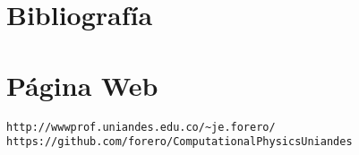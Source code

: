 \documentclass[12pt]{article}
\begin{document}
\section*{Bibliograf\'ia}


\section*{P\'agina Web}
\begin{verbatim}
http://wwwprof.uniandes.edu.co/~je.forero/
https://github.com/forero/ComputationalPhysicsUniandes
\end{verbatim}

 
\end{document}

